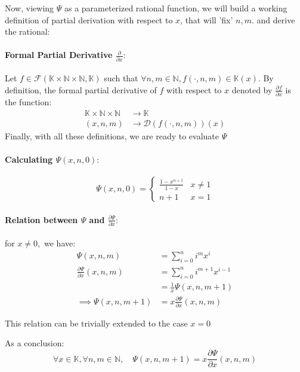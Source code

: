 \documentclass[]{article}
\begin{document}
Now, viewing $\Psi$ as a parameterized rational function, we will build a working definition of partial derivation with respect to $x$, that will 'fix' $n,m.$ and derive the rational:
\paragraph{Formal Partial Derivative $\frac{\partial}{\partial x}:$ } Let $f\in\mathcal{F}(\mathbb{K}\times\mathbb{N}\times\mathbb{N},\mathbb{K})$ such that $\forall n,m\in\mathbb{N}, f(\cdot,n,m)\in\mathbb{K}(x).$ By definition, the formal partial derivative of $f$ with respect to $x$ denoted by $\frac{\partial f}{\partial x}$ is the function:
\begin{align*}
	\mathbb{K}\times \mathbb{N}\times \mathbb{N}&\rightarrow \mathbb{K}\\
	(x,n,m) & \rightarrow \mathcal{D}(f(\cdot,n,m))(x)
\end{align*}
Finally, with all these definitions, we are ready to evaluate $\Psi$
\paragraph{Calculating $\Psi(x,n,0):$}
$$
\boxed{\Psi(x,n,0)=\begin{cases}
	\frac{1-x^{n+1}}{1-x} & x\neq 1 \\
	n+1 & x =1
\end{cases}}
$$
\paragraph{Relation between $\Psi$ and $\frac{\partial \Psi}{\partial x}:$}
for $x\neq 0,$ we have:
\begin{align*}
	\Psi(x,n,m)&=\sum_{i=0}^ni^mx^i\\
	\frac{\partial \Psi}{\partial x}(x,n,m)&=\sum_{i=0}^ni^{m+1}x^{i-1}\\
	&=\frac{1}{x}\Psi(x,n,m+1) \\
	\implies \Psi(x,n,m+1)&=x\frac{\partial \Psi}{\partial x}(x,n,m)
\end{align*}

This relation can be trivially extended to the case $x=0$

As a conclusion:
$$
\boxed{\forall x \in\mathbb{K},\forall n,m\in\mathbb{N},\quad \Psi(x,n,m+1)=x\frac{\partial \Psi}{\partial x}(x,n,m)}
$$
\end{document}
